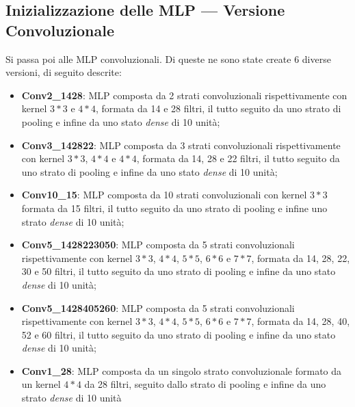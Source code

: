 \documentclass[12pt, a4paper]{article}
\begin{document}
\subsection{Inizializzazione delle MLP --- Versione Convoluzionale}
Si passa poi alle MLP convoluzionali. Di queste ne sono state create 6 diverse versioni, di seguito descrite:
\begin{itemize}
    \item \textbf{Conv2\_1428}: MLP composta da 2 strati convoluzionali rispettivamente con kernel \(3*3\) e \(4*4\), formata da 14 e 28 filtri, il tutto seguito da uno strato di pooling e infine da uno stato \textit{dense} di 10 unità;
    \item \textbf{Conv3\_142822}: MLP composta da 3 strati convoluzionali rispettivamente con kernel \(3*3\), \(4*4\) e \(4*4\), formata da 14, 28 e 22 filtri, il tutto seguito da uno strato di pooling e infine da uno stato \textit{dense} di 10 unità;
    \item \textbf{Conv10\_15}: MLP composta da 10 strati convoluzionali con kernel \(3*3\) formata da 15 filtri, il tutto seguito da uno strato di pooling e infine uno strato \textit{dense} di 10 unità; 
    \item \textbf{Conv5\_1428223050}: MLP composta da 5 strati convoluzionali rispettivamente con kernel \(3*3\), \(4*4\), \(5*5\), \(6*6\) e \(7*7\), formata da 14, 28, 22, 30 e 50 filtri, il tutto seguito da uno strato di pooling e infine da uno stato \textit{dense} di 10 unità;
    \item \textbf{Conv5\_1428405260}: MLP composta da 5 strati convoluzionali rispettivamente con kernel \(3*3\), \(4*4\), \(5*5\), \(6*6\) e \(7*7\), formata da 14, 28, 40, 52 e 60 filtri, il tutto seguito da uno strato di pooling e infine da uno stato \textit{dense} di 10 unità;
    \item \textbf{Conv1\_28}: MLP composta da un singolo strato convoluzionale formato da un kernel \(4*4\) da 28 filtri, seguito dallo strato di pooling e infine da uno strato \textit{dense} di 10 unità
\end{itemize}
\end{document}
